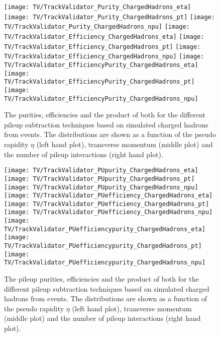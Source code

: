 \begin{figure}[h!t]
  \centering
  \texttt{[image: TV/TrackValidator\_Purity\_ChargedHadrons\_eta]}
  \texttt{[image: TV/TrackValidator\_Purity\_ChargedHadrons\_pt]}
  \texttt{[image: TV/TrackValidator\_Purity\_ChargedHadrons\_npu]}
  \newline
  \texttt{[image: TV/TrackValidator\_Efficiency\_ChargedHadrons\_eta]}
  \texttt{[image: TV/TrackValidator\_Efficiency\_ChargedHadrons\_pt]}
  \texttt{[image: TV/TrackValidator\_Efficiency\_ChargedHadrons\_npu]}
  \newline
  \texttt{[image: TV/TrackValidator\_EfficiencyPurity\_ChargedHadrons\_eta]}
  \texttt{[image: TV/TrackValidator\_EfficiencyPurity\_ChargedHadrons\_pt]}
  \texttt{[image: TV/TrackValidator\_EfficiencyPurity\_ChargedHadrons\_npu]}
  \caption[Purity, efficiency and their product for the different pileup subtraction techniques based on simulated charged hadrons from \ttbar events]{The purities, efficiencies and the product of both for the different pileup subtraction techniques based on simulated charged hadrons from \ttbar events. The distributions are shown as a function of the pseudo rapidity $\eta$ (left hand plot), transverse momentum (middle plot) and the number of pileup interactions (right hand plot). \label{plot:TACOACHSignal}}
\end{figure}

\begin{figure}[h!t]
  \centering
  \texttt{[image: TV/TrackValidator\_PUpurity\_ChargedHadrons\_eta]}
  \texttt{[image: TV/TrackValidator\_PUpurity\_ChargedHadrons\_pt]}
  \texttt{[image: TV/TrackValidator\_PUpurity\_ChargedHadrons\_npu]}
  \newline
  \texttt{[image: TV/TrackValidator\_PUefficiency\_ChargedHadrons\_eta]}
  \texttt{[image: TV/TrackValidator\_PUefficiency\_ChargedHadrons\_pt]}
  \texttt{[image: TV/TrackValidator\_PUefficiency\_ChargedHadrons\_npu]}
  \newline
  \texttt{[image: TV/TrackValidator\_PUefficiencypurity\_ChargedHadrons\_eta]}
  \texttt{[image: TV/TrackValidator\_PUefficiencypurity\_ChargedHadrons\_pt]}
  \texttt{[image: TV/TrackValidator\_PUefficiencypurity\_ChargedHadrons\_npu]}
  \caption[Pileup purity, efficiency and their product for the different pileup subtraction techniques based on simulated charged hadrons from \ttbar events]{The pileup purities, efficiencies and the product of both for the different pileup subtraction techniques based on simulated charged hadrons from \ttbar events. The distributions are shown as a function of the pseudo rapidity $\eta$ (left hand plot), transverse momentum (middle plot) and the number of pileup interactions (right hand plot). \label{plot:TACOACHPileup}}
\end{figure}


